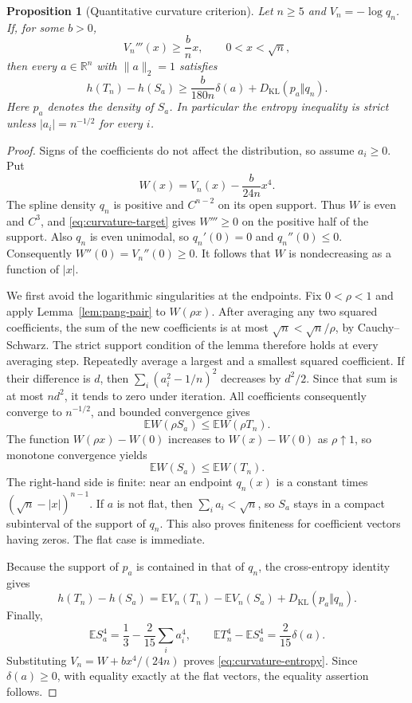 \documentclass[11pt,a4paper]{article}
\newtheorem{proposition}[theorem]{Proposition}
\theoremstyle{remark}\newtheorem{remark}[theorem]{Remark}
\newcommand{\E}{\mathbb E}
\newcommand{\KL}{D_{\mathrm{KL}}}
\begin{document}
\begin{proposition}[Quantitative curvature criterion]\label{prop:curvature-stability}
Let $n\ge5$ and $V_n=-\log q_n$. If, for some $b>0$,
\begin{equation}\label{eq:curvature-target}
 V_n'''(x)\ge\frac b n x,\qquad 0<x<\sqrt n,
\end{equation}
then every $a\in\mathbb R^n$ with $\|a\|_2=1$ satisfies
\begin{equation}\label{eq:curvature-entropy}
 h(T_n)-h(S_a)\ge\frac{b}{180n}\delta(a)+\KL(p_a\Vert q_n).
\end{equation}
Here $p_a$ denotes the density of $S_a$. In particular the entropy
inequality is strict unless $|a_i|=n^{-1/2}$ for every $i$.
\end{proposition}
\begin{proof}
Signs of the coefficients do not affect the distribution, so assume
$a_i\ge0$. Put
\[
 W(x)=V_n(x)-\frac{b}{24n}x^4.
\]
The spline density $q_n$ is positive and $C^{n-2}$ on its open support.
Thus $W$ is even and $C^3$, and \eqref{eq:curvature-target} gives
$W'''\ge0$ on the positive half of the support. Also $q_n$ is even
unimodal, so $q_n'(0)=0$ and $q_n''(0)\le0$. Consequently
$W''(0)=V_n''(0)\ge0$. It follows that $W$ is nondecreasing as a
function of $|x|$.

We first avoid the logarithmic singularities at the endpoints. Fix
$0<\rho<1$ and apply Lemma~\ref{lem:pang-pair} to $W(\rho x)$.
After averaging any two squared coefficients, the sum of the new
coefficients is at most $\sqrt n<\sqrt n/\rho$, by Cauchy--Schwarz.
The strict support condition of the lemma therefore holds at every
averaging step. Repeatedly average a largest and a smallest squared
coefficient. If their difference is $d$, then
$\sum_i(a_i^2-1/n)^2$ decreases by $d^2/2$. Since that sum is at most
$nd^2$, it tends to zero under iteration. All coefficients consequently
converge to $n^{-1/2}$, and bounded convergence gives
\[
 \E W(\rho S_a)\le\E W(\rho T_n).
\]
The function $W(\rho x)-W(0)$ increases to $W(x)-W(0)$ as
$\rho\uparrow1$, so monotone convergence yields
\[
 \E W(S_a)\le\E W(T_n).
\]
The right-hand side is finite: near an endpoint $q_n(x)$ is a constant
times $(\sqrt n-|x|)^{n-1}$. If $a$ is not flat, then
$\sum_i a_i<\sqrt n$, so $S_a$ stays in a compact subinterval of the
support of $q_n$. This also proves finiteness for coefficient vectors
having zeros. The flat case is immediate.

Because the support of $p_a$ is contained in that of $q_n$, the
cross-entropy identity gives
\[
 h(T_n)-h(S_a)
 =\E V_n(T_n)-\E V_n(S_a)+\KL(p_a\Vert q_n).
\]
Finally,
\[
 \E S_a^4=\frac13-\frac2{15}\sum_i a_i^4,
 \qquad \E T_n^4-\E S_a^4=\frac2{15}\delta(a).
\]
Substituting $V_n=W+bx^4/(24n)$ proves
\eqref{eq:curvature-entropy}. Since $\delta(a)\ge0$, with equality
exactly at the flat vectors, the equality assertion follows.
\end{proof}
\end{document}
